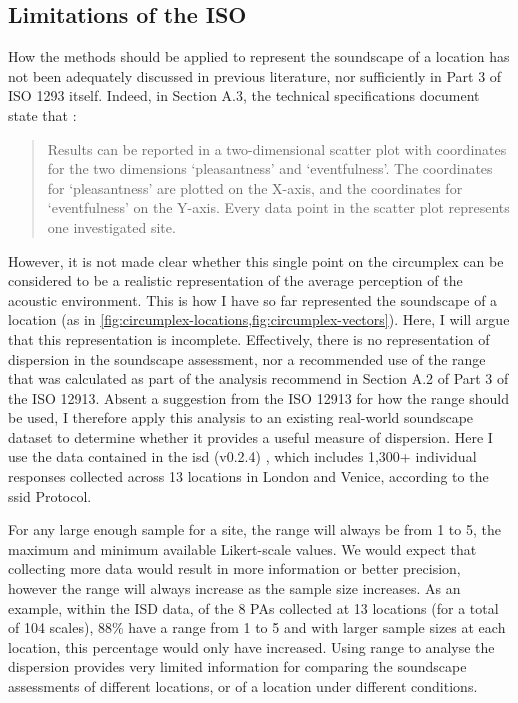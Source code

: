 \subsection{Limitations of the ISO}
How the \citet{ISO12913Part3} methods should be applied to represent the soundscape of a location has not been adequately discussed in previous literature, nor sufficiently in Part 3 of ISO 1293 itself. Indeed, in Section A.3, the technical specifications document state that \citep[p. 5]{ISO12913Part3}:

\begin{quote}
  Results can be reported in a two-dimensional scatter plot with coordinates for the two dimensions ‘pleasantness’ and ‘eventfulness’. The coordinates for ‘pleasantness’ are plotted on the X-axis, and the coordinates for ‘eventfulness’ on the Y-axis. Every data point in the scatter plot represents one investigated site.
\end{quote}

However, it is not made clear whether this single point on the circumplex can be considered to be a realistic representation of the average perception of the acoustic environment. This is how I have so far represented the soundscape of a location (as in \cref{fig:circumplex-locations,fig:circumplex-vectors}). Here, I will argue that this representation is incomplete. Effectively, there is no representation of dispersion in the soundscape assessment, nor a recommended use of the range that was calculated as part of the analysis recommend in Section A.2 of Part 3 of the ISO 12913. Absent a suggestion from the ISO 12913 for how the range should be used, I therefore apply this analysis to an existing real-world soundscape dataset to determine whether it provides a useful measure of dispersion. Here I use the data contained in the \gls{isd} (v0.2.4) \citep{Mitchell2021International}, which includes 1,300+ individual responses collected across 13 locations in London and Venice, according to the \gls{ssid} Protocol.

For any large enough sample for a site, the range will always be from 1 to 5, the maximum and minimum available Likert-scale values. We would expect that collecting more data would result in more information or better precision, however the range will always increase as the sample size increases. As an example, within the ISD data, of the 8 PAs collected at 13 locations (for a total of 104 scales), 88\% have a range from 1 to 5 and with larger sample sizes at each location, this percentage would only have increased. Using range to analyse the dispersion provides very limited information for comparing the soundscape assessments of different locations, or of a location under different conditions.

